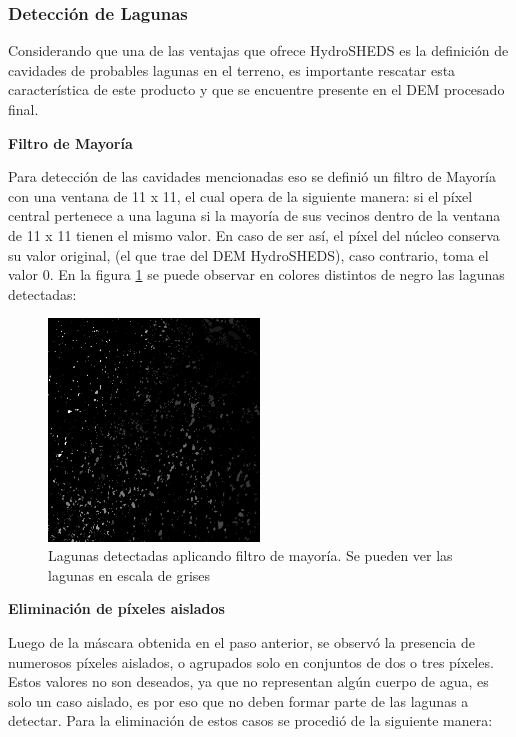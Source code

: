 \documentclass[10pt,a4paper, twoside]{report}
\begin{document}
\subsubsection{Detección de Lagunas}
\label{deteccionLagunas}

 Considerando que una de las ventajas que ofrece HydroSHEDS es la definición de cavidades de probables lagunas en el terreno, es importante rescatar esta característica de este producto y que se encuentre presente en el DEM procesado final.

\textbf{Filtro de Mayoría}

Para detección de las cavidades mencionadas eso se definió un filtro de Mayoría con una ventana de 11 x 11, el cual opera de la siguiente manera: si el píxel central pertenece a una laguna si la mayoría de sus vecinos dentro de la ventana de 11 x 11 tienen el mismo valor. En caso de ser así, el píxel del núcleo conserva su valor original, (el que trae del DEM HydroSHEDS), caso contrario, toma el valor 0. En la figura \ref{filtroMayoria} se puede observar en colores distintos de negro las lagunas detectadas:

\begin{figure}[H]
   \centering      
   \includegraphics[width=0.5\textwidth]{imagenes/filtroMayoria.jpg}
 \caption{Lagunas detectadas aplicando filtro de mayoría. Se pueden ver las lagunas en escala de grises}
 \label{filtroMayoria}
\end{figure}

\textbf{Eliminación de píxeles aislados}

Luego de la máscara obtenida en el paso anterior, se observó la presencia de numerosos píxeles aislados, o agrupados solo en conjuntos de dos o tres píxeles. Estos valores no son deseados, ya que no representan algún cuerpo de agua, es solo un caso aislado, es por eso que no deben formar parte de las lagunas a detectar. Para la eliminación de estos casos se procedió de la siguiente manera:
		
\end{document}

